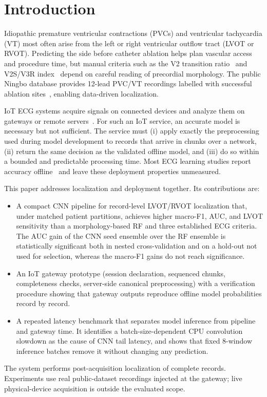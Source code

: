 \documentclass[conference,a4paper]{IEEEtran}
\begin{document}
\section{Introduction}
Idiopathic premature ventricular contractions (PVCs) and ventricular tachycardia (VT) most often arise from the left or right ventricular outflow tract (LVOT or RVOT). Predicting the side before catheter ablation helps plan vascular access and procedure time, but manual criteria such as the V2 transition ratio~\cite{betensky2011} and V2S/V3R index~\cite{yoshida2014} depend on careful reading of precordial morphology. The public Ningbo database provides 12-lead PVC/VT recordings labelled with successful ablation sites~\cite{zheng2020}, enabling data-driven localization.

IoT ECG systems acquire signals on connected devices and analyze them on gateways or remote servers~\cite{satija2017,azariadi2016}. For such an IoT service, an accurate model is necessary but not sufficient. The service must (i) apply exactly the preprocessing used during model development to records that arrive in chunks over a network, (ii) return the same decision as the validated offline model, and (iii) do so within a bounded and predictable processing time. Most ECG learning studies report accuracy offline~\cite{hannun2019,ribeiro2020,zheng2021} and leave these deployment properties unmeasured.

This paper addresses localization and deployment together. Its contributions are:
\begin{itemize}
\item A compact CNN pipeline for record-level LVOT/RVOT localization that, under matched patient partitions, achieves higher macro-F1, AUC, and LVOT sensitivity than a morphology-based RF and three established ECG criteria. The AUC gain of the CNN seed ensemble over the RF ensemble is statistically significant both in nested cross-validation and on a hold-out not used for selection, whereas the macro-F1 gains do not reach significance.
\item An IoT gateway prototype (session declaration, sequenced chunks, completeness checks, server-side canonical preprocessing) with a verification procedure showing that gateway outputs reproduce offline model probabilities record by record.
\item A repeated latency benchmark that separates model inference from pipeline and gateway time. It identifies a batch-size-dependent CPU convolution slowdown as the cause of CNN tail latency, and shows that fixed 8-window inference batches remove it without changing any prediction.
\end{itemize}
The system performs post-acquisition localization of complete records. Experiments use real public-dataset recordings injected at the gateway; live physical-device acquisition is outside the evaluated scope.
\end{document}
